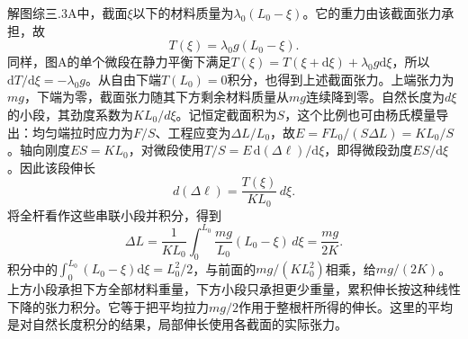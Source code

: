 \documentclass[UTF8,fontset=fandol,a4paper,11pt]{ctexart}
\begin{document}
解图综三.3A中，截面$\xi$以下的材料质量为$\lambda_0(L_0-\xi)$。它的重力由该截面张力承担，故
\[
T(\xi)=\lambda_0g(L_0-\xi).
\]
同样，图A的单个微段在静力平衡下满足$T(\xi)=T(\xi+\mathrm d\xi)+\lambda_0g\mathrm d\xi$，所以$\mathrm dT/\mathrm d\xi=-\lambda_0g$。从自由下端$T(L_0)=0$积分，也得到上述截面张力。上端张力为$mg$，下端为零，截面张力随其下方剩余材料质量从$mg$连续降到零。自然长度为$d\xi$的小段，其劲度系数为$KL_0/d\xi$。记恒定截面积为$S$，这个比例也可由杨氏模量导出：均匀端拉时应力为$F/S$、工程应变为$\Delta L/L_0$，故$E=FL_0/(S\Delta L)=KL_0/S$。轴向刚度$ES=KL_0$，对微段使用$T/S=E\,\mathrm d(\Delta\ell)/\mathrm d\xi$，即得微段劲度$ES/\mathrm d\xi$。因此该段伸长
\[
d(\Delta\ell)=\frac{T(\xi)}{KL_0}\,d\xi.
\]
将全杆看作这些串联小段并积分，得到
\[
\Delta L=\frac1{KL_0}\int_0^{L_0}\frac{mg}{L_0}(L_0-\xi)\,d\xi
=\boxed{\frac{mg}{2K}}.
\]
积分中的$\int_0^{L_0}(L_0-\xi)\mathrm d\xi=L_0^2/2$，与前面的$mg/(KL_0^2)$相乘，给$mg/(2K)$。上方小段承担下方全部材料重量，下方小段只承担更少重量，累积伸长按这种线性下降的张力积分。它等于把平均拉力$mg/2$作用于整根杆所得的伸长。这里的平均是对自然长度积分的结果，局部伸长使用各截面的实际张力。
\end{document}
